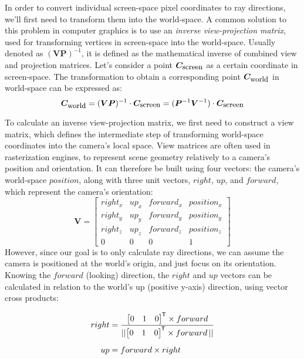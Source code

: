 In order to convert individual screen-space pixel coordinates to ray directions, we'll first need to transform them into the world-space.
A common solution to this problem in computer graphics is to use an \textit{inverse view-projection matrix}, used for transforming vertices in screen-space into the world-space.
Usually denoted as $ (\bm{VP})^{-1} $, it is defined as the mathematical inverse of combined view and projection matrices.
Let's consider a point $ \bm{C}_{\textnormal{\small screen}} $ as a certain coordinate in screen-space.
The transformation to obtain a corresponding point $ \bm{C}_{\textnormal{\small world}} $ in world-space can be expressed as:
%
\begin{equation}
    \bm{C}_{\textnormal{\small world}} = (\bm{VP})^{-1} \cdot \bm{C}_{\textnormal{\small screen}} = (\bm{P}^{-1} \bm{V}^{-1}) \cdot \bm{C}_{\textnormal{\small screen}}
\end{equation}

To calculate an inverse view-projection matrix, we first need to construct a view matrix, which defines the intermediate step of transforming world-space coordinates into the camera's local space.
View matrices are often used in rasterization engines, to represent scene geometry relatively to a camera's position and orientation.
It can therefore be built using four vectors: the camera's world-space $ position $, along with three unit vectors, $ right $, $ up $, and $ forward $, which represent the camera's orientation:
%
\begin{equation}
    \bm{V} =
    \begin{bmatrix}
        right_x & up_x & forward_x & position_x\\
        right_y & up_y & forward_y & position_y\\
        right_z & up_z & forward_z & position_z\\
        0       & 0    & 0         & 1
    \end{bmatrix}
    \label{eq:Implementation/RayGeneration/view_matrix}
\end{equation}
%
However, since our goal is to only calculate ray directions, we can assume the camera is positioned at the world's origin, and just focus on its orientation.
Knowing the $ forward $ (looking) direction, the $ right $ and $ up $ vectors can be calculated in relation to the world's up (positive y-axis) direction, using vector cross products:  
%
{
    \newcommand*{\worldup}{\begin{bmatrix} 0 & 1 & 0 \end{bmatrix}\tran}
    \begin{align}
        right &= \frac{\worldup\times forward}{\norm{\worldup\times forward\,}}\\[0.5em]
        up    &= forward \times right
    \end{align}
    
}

